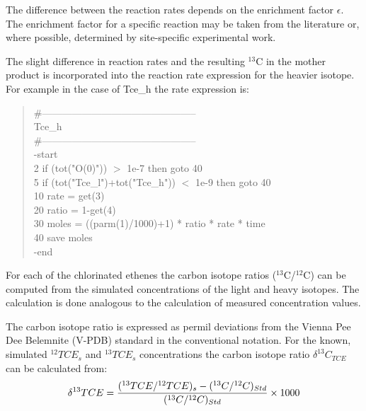The difference between the reaction rates depends on the enrichment factor $\epsilon$.
The enrichment factor for a specific reaction may be taken from the literature or, where possible,
determined by site-specific experimental work. 

The slight difference in reaction rates and the resulting $^{13}$C in the mother product is incorporated 
into the reaction rate expression for the heavier isotope. For example in the case of Tce\_h the rate expression is: \\

{\color{red}
\begin{quote}   
\#----------------------------------------------- \\
Tce\_h		\\
\#----------------------------------------------- \\
  -start \\
2  if (tot("O(0)")) $>$ 1e-7 then goto 40 \\
5  if (tot("Tce\_l")+tot("Tce\_h")) $<$ 1e-9 then goto 40 \\
10 rate = get(3)	\\
20 ratio = 1-get(4) \\
30 moles = ((parm(1)/1000)+1) * ratio * rate * time \\
40 save moles \\
-end \\
 \end{quote}
}

For each of the chlorinated ethenes the carbon isotope ratios ($^{13}$C/$^{12}$C) can be 
computed from the simulated concentrations of the light and heavy isotopes.
The calculation is done analogous to the calculation of measured concentration values.

The carbon isotope ratio is expressed as permil deviations from 
the Vienna Pee Dee Belemnite (V-PDB) standard in the conventional notation.
For the known, simulated ${{^{12}TCE}_{s}}$ and ${{^{13}TCE}_{s}}$ concentrations the carbon 
isotope ratio $\delta ^{13}C_{TCE}$ can be calculated from: \\


\begin{equation}
{ \delta ^{13}TCE  = {({^{13}TCE} / {^{12}TCE})_{s} -  ({^{13}C} / {^{12}C})_{Std}  \over  ({^{13}C} / {^{12}C})_{Std} } \times 1000 }
\label{eq:vpdb}
\end{equation}

